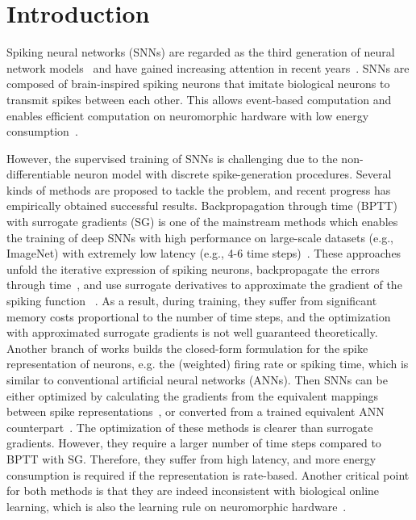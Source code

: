 \documentclass{article}
\begin{document}
\section{Introduction}
\vspace{-2mm}
Spiking neural networks (SNNs) are regarded as the third generation of neural network models~\cite{maass1997networks} and have gained increasing attention in recent years~\cite{lee2016training,shrestha2018slayer,wu2018spatio,roy2019towards,zheng2020going,deng2021optimal,li2021free,wu2021tandem,li2021differentiable,fang2021deep,xiao2021training,deng2021temporal}. SNNs are composed of brain-inspired spiking neurons that imitate biological neurons to transmit spikes between each other. This allows event-based computation and enables efficient computation on neuromorphic hardware with low energy consumption~\cite{akopyan2015truenorth,davies2018loihi,pei2019towards}. 

However, the supervised training of SNNs is challenging due to the non-differentiable neuron model with discrete spike-generation procedures. Several kinds of methods are proposed to tackle the problem, and recent progress has empirically obtained successful results. Backpropagation through time (BPTT) with surrogate gradients (SG) is one of the mainstream methods which enables the training of deep SNNs with high performance on large-scale datasets (e.g., ImageNet) with extremely low latency (e.g., 4-6 time steps)~\cite{zheng2020going,li2021differentiable,fang2021deep,deng2021temporal}. These approaches unfold the iterative expression of spiking neurons, backpropagate the errors through time~\cite{werbos1990backpropagation}, and use surrogate derivatives to approximate the gradient of the spiking function ~\cite{shrestha2018slayer,wu2018spatio,bellec2018long,jin2018hybrid,wu2019direct,neftci2019surrogate,kim2020unifying,Fang_2021_ICCV}. As a result, during training, they suffer from significant memory costs proportional to the number of time steps, and the optimization with approximated surrogate gradients is not well guaranteed theoretically. 
Another branch of works builds the closed-form formulation for the spike representation of neurons, e.g. the (weighted) firing rate or spiking time, which is similar to conventional artificial neural networks (ANNs). Then SNNs can be either optimized by calculating the gradients from the equivalent mappings between spike representations~\cite{lee2016training,thiele2019spikegrad,wu2021training,zhou2021temporal,wu2021tandem,meng2022training}, or converted from a trained equivalent ANN counterpart~\cite{hunsberger2015spiking,rueckauer2017conversion,sengupta2019going,rathi2019enabling,han2020deep,deng2021optimal,yan2021near,li2021free,stockl2021optimized}. The optimization of these methods is clearer than surrogate gradients. However, they require a larger number of time steps compared to BPTT with SG. Therefore, they suffer from high latency, and more energy consumption is required if the representation is rate-based. Another critical point for both methods is that they are indeed inconsistent with biological online learning, which is also the learning rule on neuromorphic hardware~\cite{davies2018loihi}. 
\end{document}
